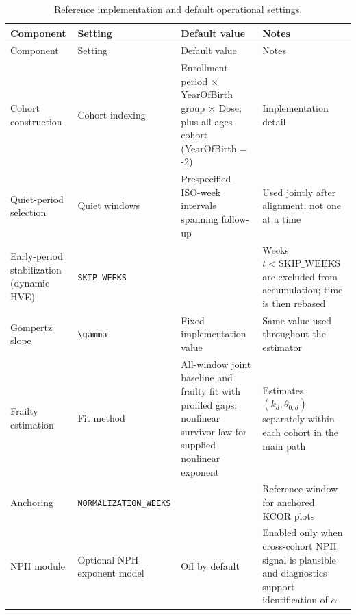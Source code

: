 \documentclass[
]{article}
\begin{document}
\begin{longtable}[]{@{}
  >{\raggedright\arraybackslash}p{}
  >{\raggedright\arraybackslash}p{}
  >{\raggedright\arraybackslash}p{}
  >{\raggedright\arraybackslash}p{}@{}}
\caption{Reference implementation and default operational settings.}\label{tbl:si_defaults}\tabularnewline
\toprule\noalign{}
\begin{minipage}[b]{\linewidth}\raggedright
Component
\end{minipage} & \begin{minipage}[b]{\linewidth}\raggedright
Setting
\end{minipage} & \begin{minipage}[b]{\linewidth}\raggedright
Default value
\end{minipage} & \begin{minipage}[b]{\linewidth}\raggedright
Notes
\end{minipage} \\
\midrule\noalign{}
\endfirsthead
\toprule\noalign{}
\begin{minipage}[b]{\linewidth}\raggedright
Component
\end{minipage} & \begin{minipage}[b]{\linewidth}\raggedright
Setting
\end{minipage} & \begin{minipage}[b]{\linewidth}\raggedright
Default value
\end{minipage} & \begin{minipage}[b]{\linewidth}\raggedright
Notes
\end{minipage} \\
\midrule\noalign{}
\endhead
\bottomrule\noalign{}
\endlastfoot
Cohort construction & Cohort indexing & Enrollment period × YearOfBirth group × Dose; plus all-ages cohort (YearOfBirth = -2) & Implementation detail \\
Quiet-period selection & Quiet windows & Prespecified ISO-week intervals spanning follow-up & Used jointly after alignment, not one at a time \\
Early-period stabilization (dynamic HVE) & \texttt{SKIP\_WEEKS} & 2 & Weeks \(t < \mathrm{SKIP\_WEEKS}\) are excluded from accumulation; time is then rebased \\
Gompertz slope & \texttt{\textbackslash{}gamma} & Fixed implementation value & Same value used throughout the estimator \\
Frailty estimation & Fit method & All-window joint baseline and frailty fit with profiled gaps; nonlinear survivor law for supplied nonlinear exponent & Estimates \((k_d,\theta_{0,d})\) separately within each cohort in the main path \\
Anchoring & \texttt{NORMALIZATION\_WEEKS} & 4 & Reference window for anchored KCOR plots \\
NPH module & Optional NPH exponent model & Off by default & Enabled only when cross-cohort NPH signal is plausible and diagnostics support identification of \(\alpha\) \\
\end{longtable}
\end{document}
